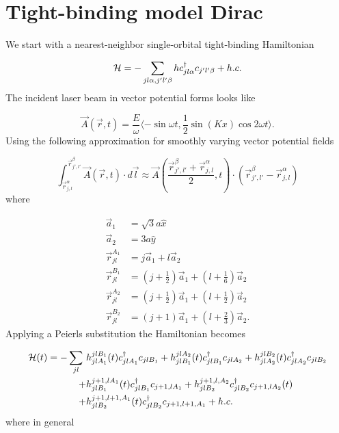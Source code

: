 \section{Tight-binding model Dirac}
We start with a nearest-neighbor single-orbital tight-binding Hamiltonian

\begin{equation}
  \mathcal{H} = - \sum_{jl\alpha,j'l'\beta} h c^{\dagger}_{jl\alpha} c_{j'l'\beta} + h.c.
\end{equation}
The incident laser beam in vector potential forms looks like

\begin{equation}
  \vec{A}(\vec{r},t) = \dfrac{E}{\omega} \langle -\sin \omega t, \dfrac{1}{2} \sin(Kx) \cos 2\omega t \rangle.
\end{equation}
Using the following approximation for smoothly varying vector potential fields

\begin{equation}
  \int_{\vec{r}_{j,l}^{\alpha}} ^{\vec{r}_{j',l'}^{\beta}} \vec{A}(\vec{r},t) \cdot d\vec{l} \approx \vec{A} \left( \dfrac{ \vec{r}_{j',l'}^{\beta} + \vec{r}_{j,l}^{\alpha} }{2}, t \right) \cdot \left( \vec{r}_{j',l'}^{\beta} - \vec{r}_{j,l}^{\alpha} \right)
\end{equation}
where

\begin{align}
  \vec{a}_1 &= \sqrt{3}a\hat{x} \\
  \vec{a}_2 &= 3a\hat{y} \\
  \vec{r}_{jl}^{A_1} &= j\vec{a}_1 + l\vec{a}_2 \\
  \vec{r}_{jl}^{B_1} &= (j+\tfrac{1}{2})\vec{a}_1 + (l+\tfrac{1}{6})\vec{a}_2 \\
  \vec{r}_{jl}^{A_2} &= (j+\tfrac{1}{2})\vec{a}_1 + (l+\tfrac{1}{2})\vec{a}_2 \\
  \vec{r}_{jl}^{B_2} &= (j+1)\vec{a}_1 + (l+\tfrac{2}{3})\vec{a}_2.
\end{align}
Applying a Peierls substitution the Hamiltonian becomes

\begin{equation}
\begin{split}
  \mathcal{H} (t) = -\sum_{jl} \ &h_{jlA_1}^{jlB_1}(t) c^{\dagger}_{jlA_1} c_{jlB_1} + h_{jlB_1}^{jlA_2}(t) c^{\dagger}_{jlB_1} c_{jlA_2} + h_{jlA_2}^{jlB_2}(t) c^{\dagger}_{jlA_2} c_{jlB_2} \\
      + &h_{jlB_1}^{j+1,lA_1}(t) c^{\dagger}_{jlB_1} c_{j+1,lA_1} + h_{jlB_2}^{j+1,l,A_2} c^{\dagger}_{jlB_2} c_{j+1,lA_2}(t) \\
      + &h_{jlB_2}^{j+1,l+1,A_1}(t) c^{\dagger}_{jlB_2} c_{j+1,l+1,A_1} + h.c.
\end{split}
\end{equation}
where in general

